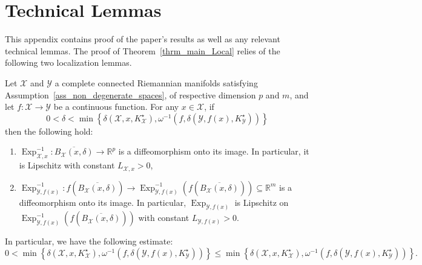 \documentclass[anon,12pt]{colt2021} %
\newcommand{\rr}{{\mathbb{R}}}
\newcommand{\rrflex}[1]{{\ensuremath{\rr^{#1}
}}}
\newcommand{\rrm}{{\rrflex{m}}}
\newcommand{\rrp}{{\rrflex{p}}}
\newcommand{\xxx}{\mathcal{X}}
\newcommand{\yyy}{\mathcal{Y}}
\begin{document}
\section{Technical Lemmas}\label{lem_techincal_lemmas}
This appendix contains proof of the paper's results as well as any relevant technical lemmas.  
The proof of Theorem~\ref{thrm_main_Local} relies of the following two localization lemmas.  
\begin{lemma}\label{lem_redux_to_Euclidean_diffeo_Lipschitz_tools}
Let $\xxx$ and $\yyy$ a complete connected Riemannian manifolds satisfying Assumption~\ref{ass_non_degenerate_spaces}, of respective dimension $p$ and $m$, and let $f:\xxx\rightarrow\yyy$ be a continuous function.  For any $x \in \xxx$, if 
$$
0<\delta < \min\left\{
\delta(\xxx,x,K^{\star}_{\xxx}),
\omega^{-1}\left(f,
\delta(\yyy,f(x),K^{\star}_{\yyy})
\right)
\right\}
$$
then the following hold:
\begin{enumerate}[label=(i),leftmargin=1.75em]
    \item $\operatorname{Exp}_{\xxx,x}^{-1}:\overline{B_{\xxx}(x,\delta)} \rightarrow \rrp$ is a diffeomorphism onto its image.  In particular, it is Lipschitz with constant $L_{\xxx,x}>0$,
    \item $\operatorname{Exp}_{\yyy,f(x)}^{-1}:f(\overline{B_{\xxx}(x,\delta)}) \rightarrow \operatorname{Exp}_{\yyy,f(x)}^{-1}\left(
    f(\overline{B_{\xxx}(x,\delta)})
    \right)\subseteq \rrm$ is a diffeomorphism onto its image.
    In particular, $\operatorname{Exp}_{\yyy,f(x)}$ is Lipschitz on 
    \\$
    \operatorname{Exp}_{\yyy,f(x)}^{-1}\left(
    f(\overline{B_{\xxx}(x,\delta)})
    \right)
    $
    with constant $L_{\yyy,f(x)}>0$.
\end{enumerate}
In particular, we have the following estimate:
$$
0 < 
\min\left\{
\delta(\xxx,x,K^{\star}_{\xxx}),
\omega^{-1}\left(f,
\delta(\yyy,f(x),K^{\star}_{\yyy})
\right)
\right\}
\leq 
\min\left\{
\delta(\xxx,x,K^{\star}_{\xxx}),
\omega^{-1}\left(f,
\delta(\yyy,f(x),K^{\star}_{\yyy})
\right)
\right\}
.
$$
\end{lemma}
\end{document}
